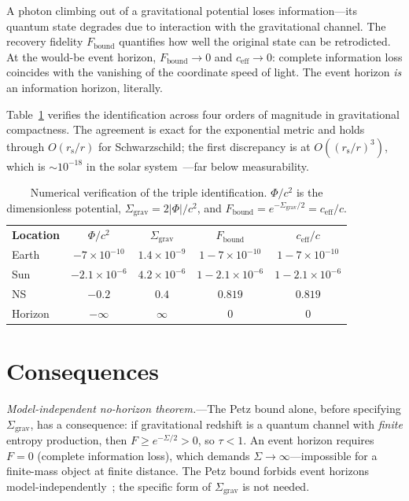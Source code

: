 \documentclass[prl,twocolumn,superscriptaddress,floatfix,nofootinbib]{revtex4-2}
\newcommand{\tauasym}{\tau}
\newcommand{\ceff}{c_{\mathrm{eff}}}
\newcommand{\rs}{r_{\mathrm{s}}}
\newcommand{\Sgrav}{\Sigma_{\mathrm{grav}}}
\newcommand{\Fbound}{F_{\mathrm{bound}}}
\begin{document}
A photon climbing out of a gravitational potential loses
information---its quantum state degrades due to
interaction with the gravitational channel.
The recovery fidelity $\Fbound$ quantifies
how well the original state can be retrodicted.
At the would-be event horizon, $\Fbound \to 0$ and
$\ceff \to 0$: complete information loss
coincides with the vanishing of the coordinate speed
of light. The event horizon \emph{is} an information
horizon, literally.

Table~\ref{tab:numerical} verifies the identification
across four orders of magnitude in gravitational
compactness.
The agreement is exact for the exponential metric and
holds through $O(\rs/r)$ for Schwarzschild; the first
discrepancy is at $O((\rs/r)^3)$, which is
$\sim 10^{-18}$ in the solar
system~\cite{Bertotti2003}---far below measurability.

\begin{table}[b]
\caption{\label{tab:numerical}%
Numerical verification of the triple identification.
$\Phi/c^2$ is the dimensionless potential,
$\Sgrav = 2|\Phi|/c^2$, and
$\Fbound = e^{-\Sgrav/2} = \ceff/c$.}
\begin{ruledtabular}
\begin{tabular}{lcccc}
  \textbf{Location} & $\Phi/c^2$ & $\Sgrav$ & $\Fbound$ & $\ceff/c$ \\
  \colrule
  Earth
    & $-7{\times}10^{-10}$
    & $1.4{\times}10^{-9}$ & $1{-}7{\times}10^{-10}$
    & $1{-}7{\times}10^{-10}$ \\
  Sun
    & $-2.1{\times}10^{-6}$
    & $4.2{\times}10^{-6}$ & $1{-}2.1{\times}10^{-6}$
    & $1{-}2.1{\times}10^{-6}$ \\
  NS
    & $-0.2$
    & $0.4$ & $0.819$ & $0.819$ \\
  Horizon
    & $-\infty$
    & $\infty$ & $0$ & $0$ \\
\end{tabular}
\end{ruledtabular}
\end{table}

\section{Consequences}
\label{sec:consequences}

\emph{Model-independent no-horizon theorem.}---The Petz
bound alone, before specifying $\Sgrav$, has a
consequence: if gravitational redshift is a quantum
channel with \emph{finite} entropy production, then
$F \geq e^{-\Sigma/2} > 0$, so $\tauasym < 1$.
An event horizon requires $F = 0$
(complete information loss), which demands
$\Sigma \to \infty$---impossible for a finite-mass
object at finite distance.
The Petz bound forbids event horizons
model-independently~\cite{JRSWW2018};
the specific form of $\Sgrav$ is not needed.
\end{document}
